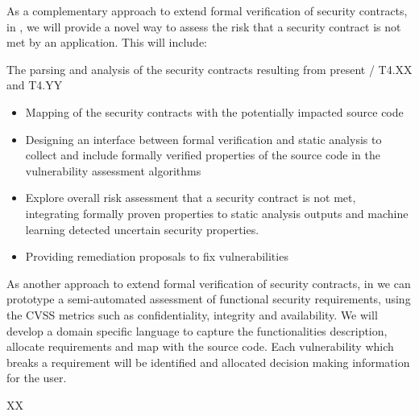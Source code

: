 \begin{Workpackage}{\thewpno}
\begin{Task}

\TaskResults{%
}
\TaskHeader{}

As a complementary approach to extend formal verification of security contracts, in \theTask, we will provide a novel way to assess the risk that a security contract is not met by an application. This will include:
\item The parsing and analysis of the security contracts resulting from present \theWP / T4.XX and T4.YY
\begin{itemize}
    \item Mapping of the security contracts with the potentially impacted source code
    \item Designing an interface between formal verification and static analysis to collect and include formally verified properties of the source code in the vulnerability assessment algorithms
    \item Explore overall risk assessment that a security contract is not met, integrating formally proven properties to static analysis outputs and machine learning detected uncertain security properties.
    \item Providing remediation proposals to fix vulnerabilities
\end{itemize}

\end{Task}


\begin{Task}

\TaskResults{%
}
\TaskHeader{}

As another approach to extend formal verification of security contracts, in \theTask we can prototype a semi-automated assessment of functional security requirements, using the CVSS metrics such as confidentiality, integrity and availability.
We will develop a domain specific language to capture the functionalities description, allocate requirements and map with the source code. Each vulnerability which breaks a requirement will be identified and allocated decision making information for the user.
\end{Task}


\begin{WPDeliverables}
  \begin{compactitem}
    \item XX
\end{compactitem}
\end{WPDeliverables}
\end{Workpackage}

